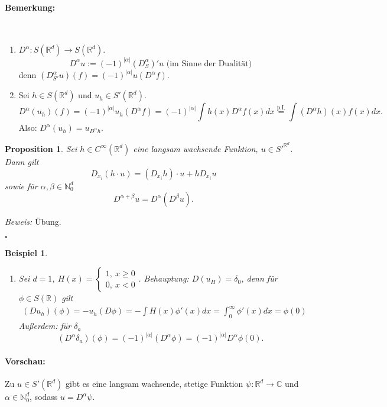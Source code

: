 \documentclass[11pt,a4paper,titlepage, ngerman]{scrartcl}
\newtheorem{Beispiel}[Satz]{Beispiel}
\newtheorem{Prop}[Satz]{Proposition}
\numberwithin{equation}{section}
\newcommand{\C}{\mathbb{C}} %
\newcommand{\R}{\mathbb{R}} %
\newcommand{\N}{\mathbb{N}} %
\newcommand{\m}{\cdot}
\newcommand{\Bew}{\emph{Beweis: }}
\newcommand{\qed}{\begin{flushright}
		$\square$
	\end{flushright}}
\begin{document}
	\paragraph{Bemerkung:} ~
	\begin{enumerate}
		\item[a)] $D^\alpha: S(\R^d)\rightarrow S(\R^d)$. 
		$$D^\alpha u := (-1)^{|\alpha|}(D_S^\alpha)'u \text{ (im Sinne der Dualität)}$$
		denn $(D_{S'}^\alpha u)(f) = (-1)^{|\alpha|} u(D^\alpha f)$.
		\item[b)] Sei $h\in S(\R^d)$ und $u_h\in S'(\R^d)$. 
		$$D^\alpha(u_h)(f) = (-1)^{|\alpha|} u_h(D^\alpha f) = (-1)^{|\alpha|}\int h(x) D^\alpha f(x) dx \overset{\text{p.I.}}{=} \int(D^\alpha h)(x) f(x) dx.$$
		Also: $\boxed{D^\alpha (u_h) = u_{D^\alpha h}.}$
	\end{enumerate}
	
	\begin{Prop}
		Sei $h\in C^{\infty}(\R^d)$ eine langsam wachsende Funktion, $u\in S'^{\R^d}$. Dann gilt
		$$D_{x_i}(h\m u) = (D_{x_i}h) \m u + h D_{x_i}u$$
		sowie für $\alpha,\beta\in \N_0^d$
		$$D^{\alpha+\beta}u = D^\alpha(D^\beta u).$$
	\end{Prop}
	
	\Bew Übung.
	\qed
	
	\begin{Beispiel}
		~
		\begin{enumerate}
			\item[a)] Sei $d= 1$, $H(x) =\left\{\begin{array}{l}
			1, ~x\geq 0\\
			0, ~x< 0
			\end{array}
			\right.$. Behauptung: $D(u_H) = \delta_0$, denn für $\phi\in S(\R)$ gilt
			\begin{eqnarray}
				(Du_h)(\phi) = -u_h(D\phi) = -\int H(x)\phi'(x)dx = \int_0^\infty \phi'(x) dx = \phi(0)\nonumber
			\end{eqnarray}
			Außerdem: für $\delta_a$
			$$(D^\alpha\delta_a)(\phi) = (-1)^{|\alpha|}(D^\alpha\phi) = (-1)^{|\alpha|}D^\alpha\phi(0).$$
		\end{enumerate}
	\end{Beispiel}
	
	\paragraph{Vorschau:} Zu $u\in S'(\R^d)$ gibt es eine langsam wachsende, stetige Funktion $\psi:\R^d\rightarrow\C$ und $\alpha\in \N_0^d$, sodass $u= D^\alpha\psi$.
	
\end{document}
